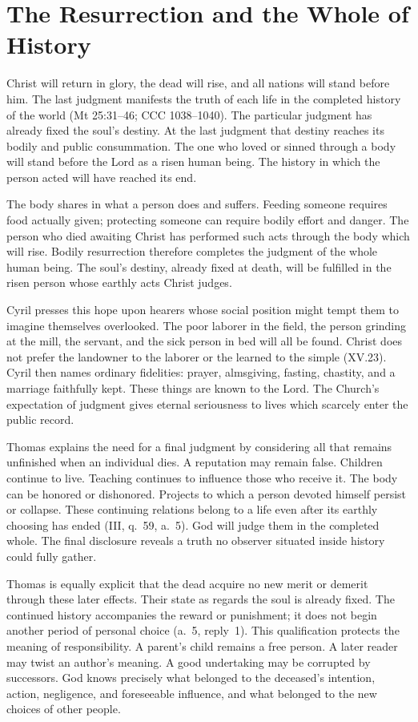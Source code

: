 \section{The Resurrection and the Whole of History}

Christ will return in glory, the dead will rise, and all nations will stand before him. The last judgment manifests the truth of each life in the completed history of the world (Mt 25:31--46; CCC 1038--1040). The particular judgment has already fixed the soul's destiny. At the last judgment that destiny reaches its bodily and public consummation. The one who loved or sinned through a body will stand before the Lord as a risen human being. The history in which the person acted will have reached its end.

The body shares in what a person does and suffers. Feeding someone requires food actually given; protecting someone can require bodily effort and danger. The person who died awaiting Christ has performed such acts through the body which will rise. Bodily resurrection therefore completes the judgment of the whole human being. The soul's destiny, already fixed at death, will be fulfilled in the risen person whose earthly acts Christ judges.

Cyril presses this hope upon hearers whose social position might tempt them to imagine themselves overlooked. The poor laborer in the field, the person grinding at the mill, the servant, and the sick person in bed will all be found. Christ does not prefer the landowner to the laborer or the learned to the simple (XV.23). Cyril then names ordinary fidelities: prayer, almsgiving, fasting, chastity, and a marriage faithfully kept. These things are known to the Lord. The Church's expectation of judgment gives eternal seriousness to lives which scarcely enter the public record.

Thomas explains the need for a final judgment by considering all that remains unfinished when an individual dies. A reputation may remain false. Children continue to live. Teaching continues to influence those who receive it. The body can be honored or dishonored. Projects to which a person devoted himself persist or collapse. These continuing relations belong to a life even after its earthly choosing has ended (III, q.~59, a.~5). God will judge them in the completed whole. The final disclosure reveals a truth no observer situated inside history could fully gather.

Thomas is equally explicit that the dead acquire no new merit or demerit through these later effects. Their state as regards the soul is already fixed. The continued history accompanies the reward or punishment; it does not begin another period of personal choice (a.~5, reply~1). This qualification protects the meaning of responsibility. A parent's child remains a free person. A later reader may twist an author's meaning. A good undertaking may be corrupted by successors. God knows precisely what belonged to the deceased's intention, action, negligence, and foreseeable influence, and what belonged to the new choices of other people.

